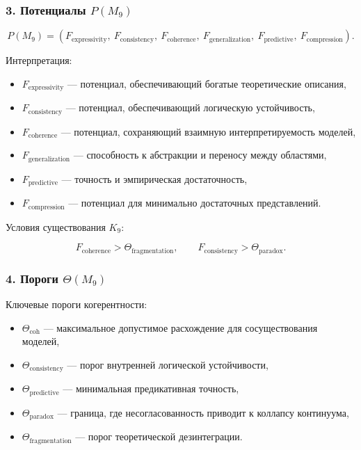 \subsubsection*{3. Потенциалы \texorpdfstring{$P(M_9)$}{P(M_9)}}

\[
P(M_9)=
(F_{\mathrm{expressivity}},\
F_{\mathrm{consistency}},\
F_{\mathrm{coherence}},\
F_{\mathrm{generalization}},\
F_{\mathrm{predictive}},\
F_{\mathrm{compression}}).
\]

Интерпретация:

\begin{itemize}
    \item $F_{\mathrm{expressivity}}$ — потенциал, обеспечивающий богатые теоретические описания,
    \item $F_{\mathrm{consistency}}$ — потенциал, обеспечивающий логическую устойчивость,
    \item $F_{\mathrm{coherence}}$ — потенциал, сохраняющий взаимную интерпретируемость моделей,
    \item $F_{\mathrm{generalization}}$ — способность к абстракции и переносу между областями,
    \item $F_{\mathrm{predictive}}$ — точность и эмпирическая достаточность,
    \item $F_{\mathrm{compression}}$ — потенциал для минимально достаточных представлений.
\end{itemize}

Условия существования $K_9$:

\[
F_{\mathrm{coherence}}>\Theta_{\mathrm{fragmentation}},
\qquad
F_{\mathrm{consistency}}>\Theta_{\mathrm{paradox}}.
\]

\subsubsection*{4. Пороги \texorpdfstring{$\Theta(M_9)$}{\Theta(M_9)}}

Ключевые пороги когерентности:

\begin{itemize}
    \item $\Theta_{\mathrm{coh}}$ — максимальное допустимое расхождение для сосуществования моделей,
    \item $\Theta_{\mathrm{consistency}}$ — порог внутренней логической устойчивости,
    \item $\Theta_{\mathrm{predictive}}$ — минимальная предикативная точность,
    \item $\Theta_{\mathrm{paradox}}$ — граница, где несогласованность приводит к коллапсу континуума,
    \item $\Theta_{\mathrm{fragmentation}}$ — порог теоретической дезинтеграции.
\end{itemize}

